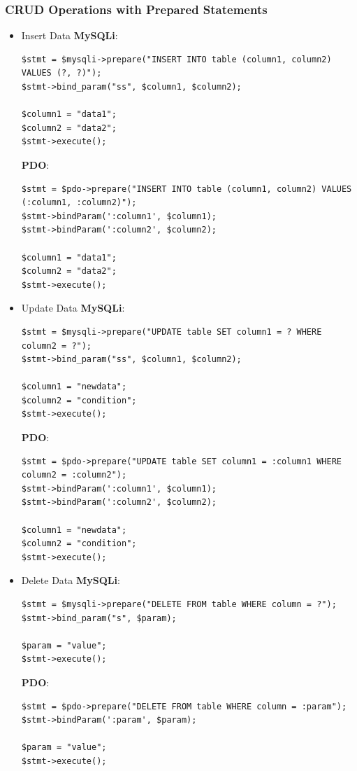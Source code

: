 \documentclass[11pt]{article}
\begin{document}
\subsubsection{CRUD Operations with Prepared Statements}
\label{sec:org12f1ebf}
\begin{itemize}
\item Insert Data
\label{sec:org19626f9}
\textbf{MySQLi}:

\begin{verbatim}
$stmt = $mysqli->prepare("INSERT INTO table (column1, column2) VALUES (?, ?)");
$stmt->bind_param("ss", $column1, $column2);

$column1 = "data1";
$column2 = "data2";
$stmt->execute();
\end{verbatim}

\textbf{PDO}:

\begin{verbatim}
$stmt = $pdo->prepare("INSERT INTO table (column1, column2) VALUES (:column1, :column2)");
$stmt->bindParam(':column1', $column1);
$stmt->bindParam(':column2', $column2);

$column1 = "data1";
$column2 = "data2";
$stmt->execute();
\end{verbatim}

\item Update Data
\label{sec:org81bcdf2}
\textbf{MySQLi}:

\begin{verbatim}
$stmt = $mysqli->prepare("UPDATE table SET column1 = ? WHERE column2 = ?");
$stmt->bind_param("ss", $column1, $column2);

$column1 = "newdata";
$column2 = "condition";
$stmt->execute();
\end{verbatim}

\textbf{PDO}:

\begin{verbatim}
$stmt = $pdo->prepare("UPDATE table SET column1 = :column1 WHERE column2 = :column2");
$stmt->bindParam(':column1', $column1);
$stmt->bindParam(':column2', $column2);

$column1 = "newdata";
$column2 = "condition";
$stmt->execute();
\end{verbatim}

\item Delete Data
\label{sec:orgee0fb4a}
\textbf{MySQLi}:

\begin{verbatim}
$stmt = $mysqli->prepare("DELETE FROM table WHERE column = ?");
$stmt->bind_param("s", $param);

$param = "value";
$stmt->execute();
\end{verbatim}

\textbf{PDO}:

\begin{verbatim}
$stmt = $pdo->prepare("DELETE FROM table WHERE column = :param");
$stmt->bindParam(':param', $param);

$param = "value";
$stmt->execute();
\end{verbatim}
\end{itemize}
\end{document}
